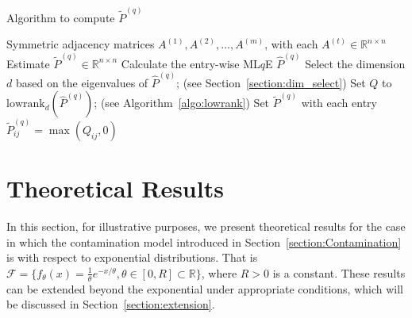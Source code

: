 \documentclass[a4paper]{article}
\renewcommand{\hat}{\widehat}
\begin{document}
\begin{algorithm}[H]
\caption{Algorithm to compute $\widetilde{P}^{(q)}$}
\label{algo:basic_q}
\begin{algorithmic}[1]
\REQUIRE Symmetric adjacency matrices $A^{(1)}, A^{(2)}, \dotsc, A^{(m)}$, with each $A^{(t)} \in \mathbb{R}^{n \times n}$
\ENSURE Estimate $\widetilde{P}^{(q)} \in \mathbb{R}^{n \times n}$
\STATE Calculate the entry-wise ML$q$E $\hat{P}^{(q)}$
\STATE Select the dimension $d$ based on the eigenvalues of $\hat{P}^{(q)}$; (see Section~\ref{section:dim_select})
\STATE Set $Q$ to $\mathrm{lowrank}_d(\hat{P}^{(q)})$; (see Algorithm~\ref{algo:lowrank})
\STATE Set $\widetilde{P}^{(q)}$ with each entry $\widetilde{P}^{(q)}_{ij} = \max(Q_{ij}, 0)$
\end{algorithmic}
\end{algorithm}


\section{Theoretical Results}
\label{section:theory}
In this section, for illustrative purposes, we present theoretical results for the case in which the contamination model introduced in Section~\ref{section:Contamination} is with respect to exponential distributions. That is $\mathcal{F} = \{ f_{\theta}(x) = \frac{1}{\theta} e^{-x/\theta}, \theta \in [0, R] \subset \mathbb{R} \}$, where $R > 0$ is a constant. These results can be extended beyond the exponential under appropriate conditions, which will be discussed in Section~\ref{section:extension}.
\end{document}
